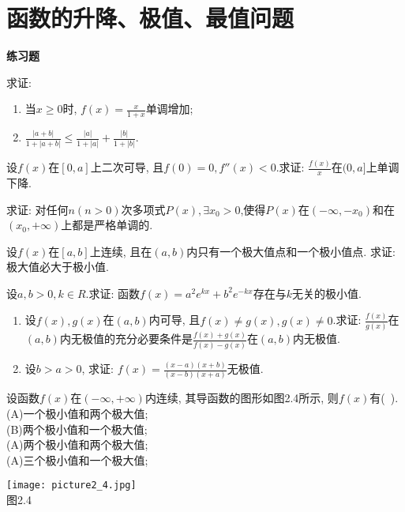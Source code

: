 \section{函数的升降、极值、最值问题}
\centering\textbf{练习题}
\begin{enumerate}
	\item 求证: 
	\begin{enumerate}
		\item 当$x\ge 0$时, $f(x)=\frac{x}{1+x}$单调增加;
		\item $\frac{|a+b|}{1+|a+b|}\le \frac{|a|}{1+|a|}+\frac{|b|}{1+|b|}$.
	\end{enumerate}
		\item 设$f(x)$在$[0,a]$上二次可导, 且$f(0)=0, f''(x)<0$.求证: $\frac{f(x)}{x}$在$(0,a]$上单调下降.
		\item 求证: 对任何$n(n>0)$次多项式$P(x),\exists x_0>0$,使得$P(x)$在$(-\infty,-x_0)$和在$(x_0,+\infty)$上都是严格单调的.
		\item 设$f(x)$在$[a,b]$上连续, 且在$(a,b)$内只有一个极大值点和一个极小值点. 求证: 极大值必大于极小值.
		\item 设$a,b>0,k\in R$.求证: 函数$f(x)=a^2e^{kx}+b^2e^{-kx}$存在与$k$无关的极小值.
		\item 
		\begin{enumerate}
			\item 设$f(x), g(x)$在$(a,b)$内可导, 且$f(x)\ne g(x),g(x)\ne 0$.求证: $\frac{f(x)}{g(x)}$在$(a,b)$内无极值的充分必要条件是$\frac{f(x)+g(x)}{f(x)-g(x)}$在$(a,b)$内无极值.
			\item 设$b>a>0$, 求证: $f(x)=\frac{(x-a)(x+b)}{(x-b)(x+a)}$无极值.
		\end{enumerate}
\begin{minipage}[b]{0.55\linewidth}
	\item 设函数$f(x)$在$(-\infty,+\infty)$内连续, 其导函数的图形如图2.4所示, 则$f(x)$有(\ ).\\
		\text{\qquad} (A)一个极小值和两个极大值;\\
		\text{\qquad} (B)两个极小值和一个极大值;\\
		\text{\qquad} (A)两个极小值和两个极大值;\\
		\text{\qquad} (A)三个极小值和一个极大值;
\end{minipage}
\hfill
\begin{minipage}[b]{0.65\linewidth}
	\texttt{[image: picture2\_4.jpg]}\\
	\text{\qquad \quad} 图2.4
\end{minipage}
\item 

\end{enumerate}

